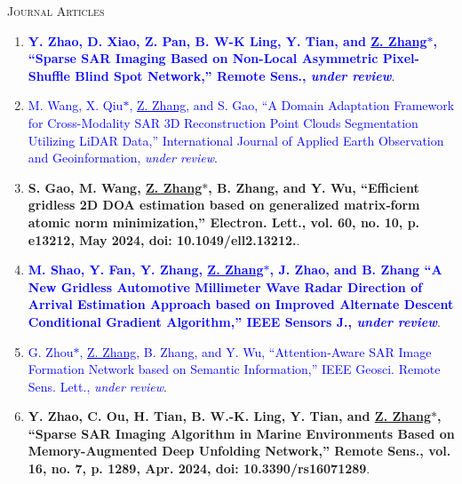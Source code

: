 \documentclass[paper=a4,fontsize=11pt]{scrartcl}
\begin{document}
%
%

\textsc{Journal Articles}

\begin{enumerate}
	
\item \textcolor{blue}{\textbf{Y. Zhao, D. Xiao, Z. Pan, B. W-K Ling, Y. Tian, and \underline{Z. Zhang$\ast$}, ``Sparse SAR Imaging Based on Non-Local Asymmetric Pixel-Shuffle Blind Spot Network,'' Remote Sens., \emph{under review}}}.
	
\item \textcolor{blue}{M. Wang, X. Qiu$\ast$, \underline{Z. Zhang}, and S. Gao, ``A Domain Adaptation Framework for Cross-Modality SAR 3D Reconstruction Point Clouds Segmentation Utilizing LiDAR Data,'' International Journal of Applied Earth Observation and Geoinformation, \emph{under review}.}
	
\item \textbf{S. Gao, M. Wang, \underline{Z. Zhang$\ast$}, B. Zhang, and Y. Wu, 	``Efficient gridless 2D DOA estimation based on generalized matrix‐form atomic norm minimization,'' Electron. Lett., vol. 60, no. 10, p. e13212, May 2024, doi: 10.1049/ell2.13212.}.
	
\item \textcolor{blue}{\textbf{M. Shao, Y. Fan, Y. Zhang, \underline{Z. Zhang$\ast$}, J. Zhao, and B. Zhang ``A New Gridless Automotive Millimeter Wave Radar Direction of Arrival Estimation Approach based on Improved  Alternate Descent Conditional Gradient Algorithm,'' IEEE Sensors J., \emph{under review}}}.

\item \textcolor{blue}{G. Zhou$\ast$, \underline{Z. Zhang}, B. Zhang, and Y. Wu, ``Attention-Aware SAR Image Formation Network based on Semantic Information,'' IEEE Geosci. Remote Sens. Lett., \emph{under review}}.
	
\item \textbf{Y. Zhao, C. Ou, H. Tian, B. W.-K. Ling, Y. Tian, and \underline{Z. Zhang$\ast$}, ``Sparse SAR Imaging Algorithm in Marine Environments Based on Memory-Augmented Deep Unfolding Network,'' Remote Sens., vol. 16, no. 7, p. 1289, Apr. 2024, doi: 10.3390/rs16071289}.


\end{enumerate}
\end{document}
